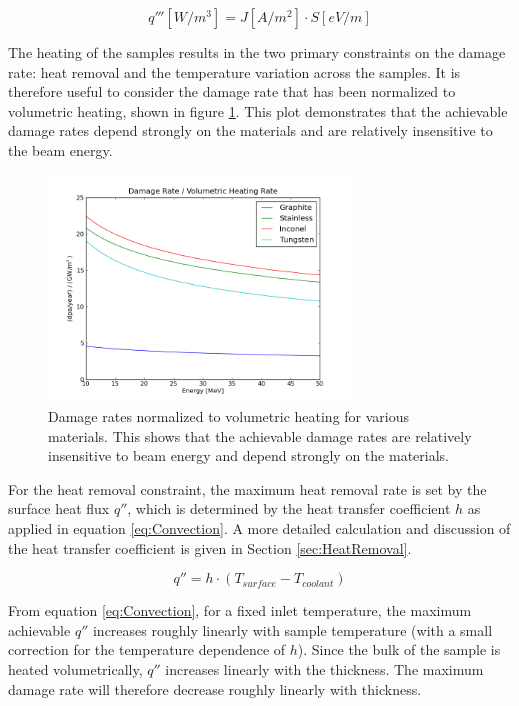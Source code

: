 \documentclass[final,3p,times,twocolumn]{elsarticle} %
\begin{document}
\begin{equation}
q''' [W/m^3] = J[A/m^2] \cdot S[eV/m]
\label{eq:BeamPower}
\end{equation}

The heating of the samples results in the two primary constraints on the damage rate: heat removal and the temperature variation across the samples.  It is therefore useful to consider the damage rate that has been normalized to volumetric heating,  shown in figure \ref{fig:DPAvsHeating}.  This plot demonstrates that the achievable damage rates depend strongly on the materials and are relatively insensitive to the beam energy.

\begin{figure}[htbp]
\begin{center}
\includegraphics[width=80mm]{Figures/DPAvsHeating.png}
\caption{Damage rates normalized to volumetric heating for various materials.  This shows that the achievable damage rates are relatively insensitive to beam energy and depend strongly on the materials.}
\label{fig:DPAvsHeating}
\end{center}
\end{figure}

For the heat removal constraint, the maximum heat removal rate is set by the surface heat flux $q''$, which is determined by the heat transfer coefficient $h$ as applied in equation \ref{eq:Convection}.  A more detailed calculation and discussion of the heat transfer coefficient is given in Section \ref{sec:HeatRemoval}.  

\begin{equation}
q'' = h \cdot (T_{surface} - T_{coolant})
\label{eq:Convection}
\end{equation} 

From equation \ref{eq:Convection}, for a fixed inlet temperature, the maximum achievable $q''$ increases roughly linearly with sample temperature (with a small correction for the temperature dependence of $h$).  Since the bulk of the sample is heated volumetrically, $q''$ increases linearly with the thickness. The maximum damage rate will therefore decrease roughly linearly with thickness.
\end{document}
